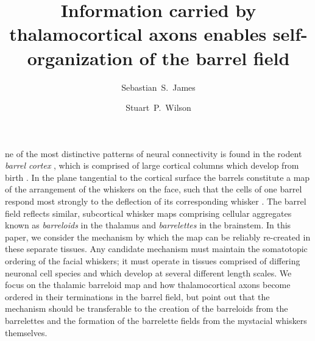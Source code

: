 \documentclass[9pt,twocolumn,twoside,lineno]{pnas-new}
\title{Information carried by thalamocortical axons enables self-organization of the barrel field}
\author[a,1]{Sebastian~S.~James}
\author[a]{Stuart~P.~Wilson}
\affil[a]{Department of Psychology, The University of Sheffield, Sheffield, United Kingdom.}
\begin{document}
\newcommand{\cmnt}[1]{\textcolor{blue}{#1}}
\newcommand{\dvrg}{\nabla\vcdot\nabla}
\newcommand{\e}{\emph}
\newcommand{\bol}{\textbf}
\newcommand{\mb}[1]{\mathbf{#1}}
\makeatletter
\newcommand*\vcdot{\mathpalette\vcdot@{.35}}
\newcommand*\vcdot@[2]{\mathbin{\vcenter{\hbox{\scalebox{#2}{$\m@th#1\bullet$}}}}}
\makeatother

\maketitle
\thispagestyle{firststyle}

\modulolinenumbers{}
\linenumbers

ne of the most distinctive patterns of neural connectivity is found
in the rodent \emph{barrel cortex} \cite{woolsey_structural_1970}, which is
comprised of large cortical columns which develop from birth
\citep{erzurumlu_development_2012}. In the plane tangential to the cortical
surface the barrels constitute a map of the arrangement of the whiskers on the
face, such that the cells of one barrel respond most strongly to the
deflection of its corresponding whisker \citep{armstrong-james_flow_1992}. The
barrel field reflects similar, subcortical whisker maps comprising cellular
aggregates known as \emph{barreloids} in the thalamus
\cite{van_der_loos_barreloids_1976} and \emph{barrelettes} in the brainstem.
%
In this paper, we consider the mechanism by which the map can be reliably
re-created in these separate tissues. Any candidate mechanism must maintain
the somatotopic ordering of the facial whiskers; it must operate in tissues
comprised of differing neuronal cell species and which develop at several
different length scales. We focus on the thalamic barreloid map and how
thalamocortical axons become ordered in their terminations in the barrel
field, but point out that the mechanism should be transferable to the creation
of the barreloids from the barrelettes and the formation of the barrelette
fields from the mystacial whiskers themselves.
\end{document}
